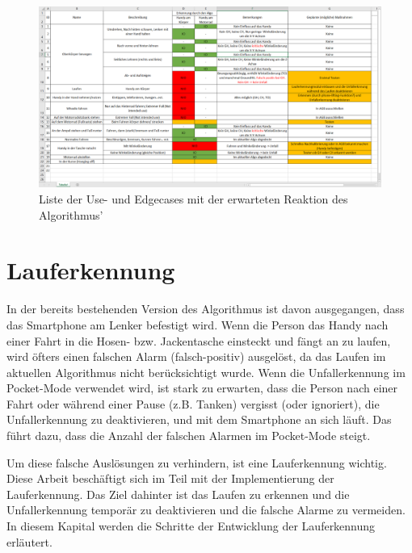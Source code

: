 \begin{figure}[H]
	\centering
	\includegraphics[width=\linewidth]{Bilder/EdgeCasesExcel.png}
	\caption{Liste der Use- und Edgecases mit der erwarteten Reaktion des Algorithmus'}
	\label{fig:EdgeCasesExcel}
\end{figure}


\section{Lauferkennung} \label{sec:Lauferkennung}
In der bereits bestehenden Version des Algorithmus ist davon ausgegangen, dass das Smartphone am Lenker befestigt wird. Wenn die Person das Handy nach einer Fahrt in die Hosen- bzw. Jackentasche einsteckt und fängt an zu laufen, wird öfters einen falschen Alarm (falsch-positiv) ausgelöst, da das Laufen im aktuellen Algorithmus nicht berücksichtigt wurde.
Wenn die Unfallerkennung im Pocket-Mode verwendet wird, ist stark zu erwarten, dass die Person nach einer Fahrt oder während einer Pause (z.B. Tanken) vergisst (oder ignoriert), die Unfallerkennung zu deaktivieren, und mit dem Smartphone an sich läuft. Das führt dazu, dass die Anzahl der falschen Alarmen im Pocket-Mode steigt.

Um diese falsche Auslösungen zu verhindern, ist eine Lauferkennung wichtig. Diese Arbeit beschäftigt sich im Teil mit der Implementierung der Lauferkennung. Das Ziel dahinter ist das Laufen zu erkennen und die Unfallerkennung temporär zu deaktivieren und die falsche Alarme zu vermeiden.
In diesem Kapital werden die Schritte der Entwicklung der Lauferkennung erläutert.


